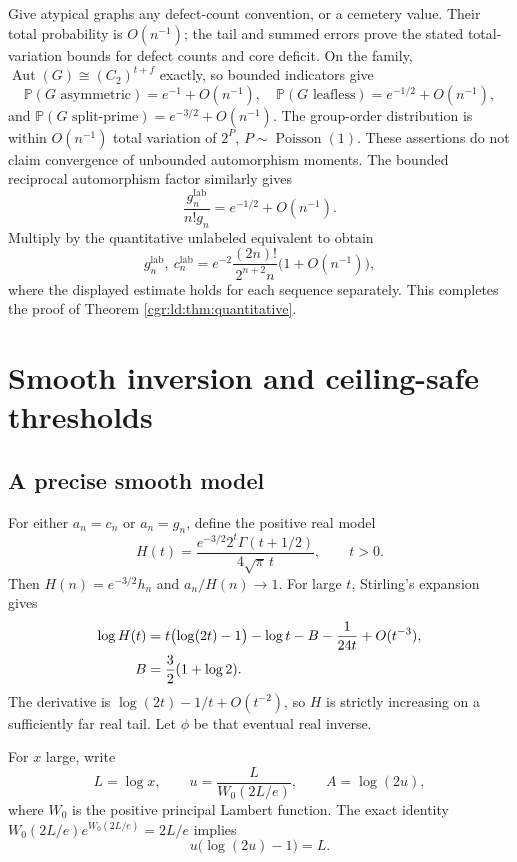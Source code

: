 \documentclass[11pt,letterpaper]{article}
\numberwithin{equation}{section}
\theoremstyle{definition}\newtheorem{definition}[theorem]{Definition}
\theoremstyle{remark}\newtheorem{remark}[theorem]{Remark}
\newcommand{\PP}{\mathbb P}
\DeclareMathOperator{\Aut}{Aut}
\DeclareMathOperator{\Poi}{Poisson}
\begin{document}
Give atypical graphs any defect-count convention, or a cemetery
value. Their total probability is $O(n^{-1})$; the tail and
summed errors prove the stated total-variation bounds for defect
counts and core deficit. On the family,
$\Aut(G)\cong(C_2)^{t+f}$ exactly, so bounded indicators give
\[
 \PP(G\text{ asymmetric})=e^{-1}+O(n^{-1}),\quad
 \PP(G\text{ leafless})=e^{-1/2}+O(n^{-1}),
\]
and $\PP(G\text{ split-prime})=e^{-3/2}+O(n^{-1})$.
The group-order distribution is within $O(n^{-1})$ total
variation of $2^P$, $P\sim\Poi(1)$. These assertions do not
claim convergence of unbounded automorphism moments.
The bounded reciprocal automorphism factor similarly gives
\[
 \frac{g_n^{\mathrm{lab}}}{n!g_n}=e^{-1/2}+O(n^{-1}).
\]
Multiply by the quantitative unlabeled equivalent to obtain
\begin{equation}\label{cgr:ld:eq:quant-labeled}
 g_n^{\mathrm{lab}},\ c_n^{\mathrm{lab}}
 =e^{-2}\frac{(2n)!}{2^{n+2}n}\bigl(1+O(n^{-1})\bigr),
\end{equation}
where the displayed estimate holds for each sequence separately.
This completes the proof of Theorem \ref{cgr:ld:thm:quantitative}.

\section{Smooth inversion and ceiling-safe thresholds}\label{cgr:ld:sec:inverse}
\subsection{A precise smooth model}
For either $a_n=c_n$ or $a_n=g_n$, define the positive real model
\begin{equation}\label{cgr:ld:eq:H}
 H(t)=\frac{e^{-3/2}2^t\Gamma(t+1/2)}{4\sqrt\pi\,t},
 \qquad t>0.
\end{equation}
Then $H(n)=e^{-3/2}h_n$ and $a_n/H(n)\to1$.
For large $t$, Stirling's expansion gives
\begin{align}
 \log H(t)
 &=t\bigl(\log(2t)-1\bigr)-\log t-B
       -\frac1{24t}+O(t^{-3}),\label{cgr:ld:eq:logH}\\
 B&=\frac32(1+\log2).\notag
\end{align}
The derivative is $\log(2t)-1/t+O(t^{-2})$, so $H$ is
strictly increasing on a sufficiently far real tail. Let $\phi$
be that eventual real inverse.

For $x$ large, write
\begin{equation}\label{cgr:ld:eq:u}
 L=\log x,\qquad u=\frac{L}{W_0(2L/e)},\qquad A=\log(2u),
\end{equation}
where $W_0$ is the positive principal Lambert function. The exact
identity $W_0(2L/e)e^{W_0(2L/e)}=2L/e$ implies
\begin{equation}\label{cgr:ld:eq:core-root}
 u\bigl(\log(2u)-1\bigr)=L.
\end{equation}
\end{document}
